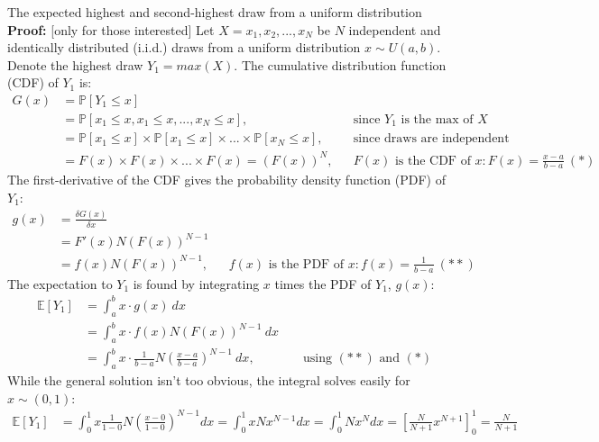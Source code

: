 \begin{frame}{The expected highest and second-highest draw from a uniform distribution}
    \textbf{Proof:} [only for those interested] Let $X=x_1,x_2,...,x_N$ be $N$ independent and identically distributed (i.i.d.) draws from a uniform distribution $x\sim U(a, b)$. Denote the highest draw $Y_1=max(X)$. The cumulative distribution function (CDF) of $Y_1$ is: \vspace{-6pt}
    \begin{align*}
      G(x)&=\mathbb{P}[Y_1\leq x]\\
          &=\mathbb{P}[x_1\leq x,x_1\leq x,...,x_N\leq x],&&\text{since $Y_1$ is the max of }X\\
          &=\mathbb{P}[x_1\leq x]\times\mathbb{P}[x_1\leq x]\times...\times\mathbb{P}[x_N\leq x],&&\text{since draws are independent}\\
          &=F(x)\times F(x)\times...\times F(x)=(F(x))^N,&&F(x)\text{ is the CDF of }x:F(x)=\frac{x-a}{b-a}\ (*)
    \end{align*}
    The first-derivative of the CDF gives the probability density function (PDF) of $Y_1$: \vspace{-6pt}
    \begin{align*}
      g(x)&=\frac{\delta G(x)}{\delta x}\\
          &= F'(x)N(F(x))^{N-1}\\
          &= f(x)N(F(x))^{N-1},&&f(x)\text{ is the PDF of }x:f(x)=\frac{1}{b-a}\ (**)
    \end{align*}
    The expectation to $Y_1$ is found by integrating $x$ times the PDF of $Y_1$, $g(x)$: \vspace{-6pt}
    \begin{align*}
      \mathbb{E}[Y_1]&=\textstyle\int_a^b x\cdot g(x)\ dx\\
                     &=\textstyle\int_a^b x\cdot f(x)N(F(x))^{N-1}\ dx\\
                     &=\textstyle\int_a^b x\cdot \frac{1}{b-a}N\left(\frac{x-a}{b-a}\right)^{N-1}\ dx,&&\text{ using }(**)\text{ and }(*)
    \end{align*}
    While the general solution isn't too obvious, the integral solves easily for $x\sim (0, 1)$: \vspace{-5pt}
    \begin{align*}
      \mathbb{E}[Y_1]&=\textstyle\int_0^1 x  \frac{1}{1-0}N\left(\frac{x-0}{1-0}\right)^{N-1} dx
      =\textstyle\int_0^1 x N x^{N-1} dx
      =\textstyle\int_0^1 N x^N dx
      =\left[\frac{N}{N+1} x^{N+1}\right]_0^1 = \frac{N}{N+1}
    \end{align*}
    \vfill\null
\end{frame}



